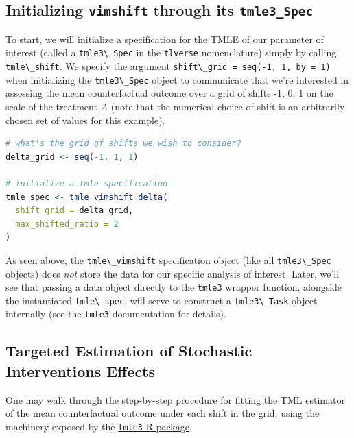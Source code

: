 \documentclass[
  12pt, krantz2,
]{krantz}
\newcommand{\passthrough}[1]{#1}
\theoremstyle{definition}
\theoremstyle{definition}
\theoremstyle{definition}
\newcommand{\1}{\mathbbm{1}}
\begin{document}
\hypertarget{initializing-vimshift-through-its-tmle3_spec}{%
\subsection{\texorpdfstring{Initializing \texttt{vimshift} through its \texttt{tmle3\_Spec}}{Initializing vimshift through its tmle3\_Spec}}\label{initializing-vimshift-through-its-tmle3_spec}}

To start, we will initialize a specification for the TMLE of our parameter of
interest (called a \passthrough{\lstinline!tmle3\_Spec!} in the \passthrough{\lstinline!tlverse!} nomenclature) simply by calling
\passthrough{\lstinline!tmle\_shift!}. We specify the argument \passthrough{\lstinline!shift\_grid = seq(-1, 1, by = 1)!}
when initializing the \passthrough{\lstinline!tmle3\_Spec!} object to communicate that we're interested
in assessing the mean counterfactual outcome over a grid of shifts -1, 0, 1 on the scale of the treatment \(A\) (note that the numerical
choice of shift is an arbitrarily chosen set of values for this example).

\begin{lstlisting}[language=R]
# what's the grid of shifts we wish to consider?
delta_grid <- seq(-1, 1, 1)

# initialize a tmle specification
tmle_spec <- tmle_vimshift_delta(
  shift_grid = delta_grid,
  max_shifted_ratio = 2
)
\end{lstlisting}

As seen above, the \passthrough{\lstinline!tmle\_vimshift!} specification object (like all \passthrough{\lstinline!tmle3\_Spec!}
objects) does \emph{not} store the data for our specific analysis of interest. Later,
we'll see that passing a data object directly to the \passthrough{\lstinline!tmle3!} wrapper function,
alongside the instantiated \passthrough{\lstinline!tmle\_spec!}, will serve to construct a \passthrough{\lstinline!tmle3\_Task!}
object internally (see the \passthrough{\lstinline!tmle3!} documentation for details).

\hypertarget{targeted-estimation-of-stochastic-interventions-effects-1}{%
\subsection{Targeted Estimation of Stochastic Interventions Effects}\label{targeted-estimation-of-stochastic-interventions-effects-1}}

One may walk through the step-by-step procedure for fitting the TML estimator
of the mean counterfactual outcome under each shift in the grid, using the
machinery exposed by the \href{https://tmle3.tlverse.org/}{\passthrough{\lstinline!tmle3!} R package}.
\end{document}
